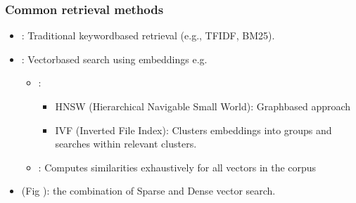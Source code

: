 \documentclass[letterpaper,11pt,english]{sphinxmanual}
\begin{document}
\subsubsection{Common retrieval methods}
\label{\detokenize{rag:common-retrieval-methods}}\begin{itemize}
\item {} 
\sphinxAtStartPar
{}: Traditional keyword\sphinxhyphen{}based retrieval (e.g., TF\sphinxhyphen{}IDF, BM25).

\item {} 
\sphinxAtStartPar
{}: Vector\sphinxhyphen{}based search using embeddings e.g.
\begin{itemize}
\item {} 
\sphinxAtStartPar
{}:
\begin{itemize}
\item {} 
\sphinxAtStartPar
HNSW (Hierarchical Navigable Small World): Graph\sphinxhyphen{}based approach

\item {} 
\sphinxAtStartPar
IVF (Inverted File Index): Clusters embeddings into groups and searches within relevant clusters.

\end{itemize}

\item {} 
\sphinxAtStartPar
{}: Computes similarities exhaustively for all vectors in the corpus

\end{itemize}

\item {} 
\sphinxAtStartPar
{} (Fig {\hyperref[\detokenize{rag:fig-retriever}]{}}): the combination of Sparse and Dense vector search.

\end{itemize}
\end{document}
